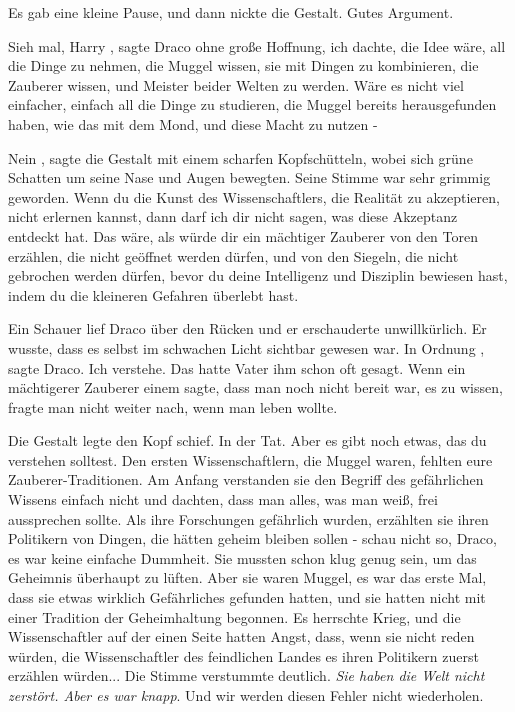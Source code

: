 Es gab eine kleine Pause, und dann nickte die Gestalt. \glqq Gutes
Argument.\grqq{}

\glqq Sieh mal, Harry\grqq{} , sagte Draco ohne große Hoffnung, \glqq ich
dachte, die Idee wäre, all die Dinge zu nehmen, die Muggel wissen, sie mit
Dingen zu kombinieren, die Zauberer wissen, und Meister beider Welten zu werden.
Wäre es nicht viel einfacher, einfach all die Dinge zu studieren, die Muggel
bereits herausgefunden haben, wie das mit dem Mond, und diese Macht zu nutzen
-\grqq{}

\glqq Nein\grqq{} , sagte die Gestalt mit einem scharfen Kopfschütteln, wobei
sich grüne Schatten um seine Nase und Augen bewegten. Seine Stimme war sehr
grimmig geworden. \glqq Wenn du die Kunst des Wissenschaftlers, die Realität zu
akzeptieren, nicht erlernen kannst, dann darf ich dir nicht sagen, was diese
Akzeptanz entdeckt hat. Das wäre, als würde dir ein mächtiger Zauberer von den
Toren erzählen, die nicht geöffnet werden dürfen, und von den Siegeln, die nicht
gebrochen werden dürfen, bevor du deine Intelligenz und Disziplin bewiesen hast,
indem du die kleineren Gefahren überlebt hast.\grqq{}

Ein Schauer lief Draco über den Rücken und er erschauderte unwillkürlich. Er
wusste, dass es selbst im schwachen Licht sichtbar gewesen war. \glqq In
Ordnung\grqq{} , sagte Draco. \glqq Ich verstehe.\grqq{} Das hatte Vater ihm
schon oft gesagt. Wenn ein mächtigerer Zauberer einem sagte, dass man noch nicht
bereit war, es zu wissen, fragte man nicht weiter nach, wenn man leben wollte.

Die Gestalt legte den Kopf schief. \glqq In der Tat. Aber es gibt noch etwas,
das du verstehen solltest. Den ersten Wissenschaftlern, die Muggel waren,
fehlten eure Zauberer-Traditionen. Am Anfang verstanden sie den Begriff des
gefährlichen Wissens einfach nicht und dachten, dass man alles, was man weiß,
frei aussprechen sollte. Als ihre Forschungen gefährlich wurden, erzählten sie
ihren Politikern von Dingen, die hätten geheim bleiben sollen - schau nicht so,
Draco, es war keine einfache Dummheit. Sie mussten schon klug genug sein, um das
Geheimnis überhaupt zu lüften. Aber sie waren Muggel, es war das erste Mal, dass
sie etwas wirklich Gefährliches gefunden hatten, und sie hatten nicht mit einer
Tradition der Geheimhaltung begonnen. Es herrschte Krieg, und die
Wissenschaftler auf der einen Seite hatten Angst, dass, wenn sie nicht reden
würden, die Wissenschaftler des feindlichen Landes es ihren Politikern zuerst
erzählen würden...\grqq{} Die Stimme verstummte deutlich. \glqq \emph{Sie haben
die Welt nicht zerstört. Aber es war knapp}. Und wir werden diesen Fehler nicht
wiederholen.\grqq{}

